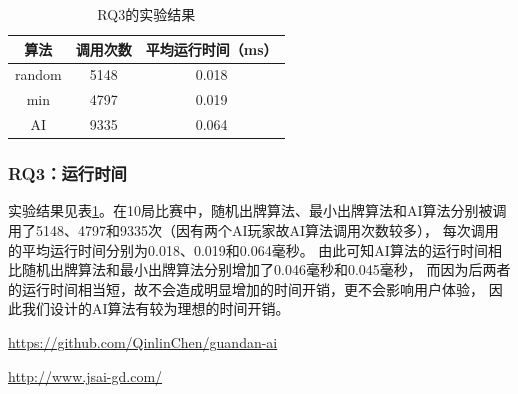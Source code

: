 \documentclass[a4paper]{ctexart}
\begin{document}
\begin{table}
	\centering
	\caption{RQ3的实验结果}
	\label{RQ3_result}
	\begin{tabular}{|c|c|c|}
		\hline
		算法 & 调用次数 & 平均运行时间（ms） \\ \hline
		random & 5148 & 0.018 \\ \hline
		min & 4797 & 0.019 \\ \hline
		AI & 9335 & 0.064 \\ \hline
	\end{tabular}
\end{table}


\subsubsection{RQ3：运行时间}

实验结果见表\ref{RQ3_result}。在10局比赛中，随机出牌算法、最小出牌算法和AI算法分别被调用了5148、4797和9335次（因有两个AI玩家故AI算法调用次数较多），
每次调用的平均运行时间分别为0.018、0.019和0.064毫秒。
由此可知AI算法的运行时间相比随机出牌算法和最小出牌算法分别增加了0.046毫秒和0.045毫秒，
而因为后两者的运行时间相当短，故不会造成明显增加的时间开销，更不会影响用户体验，
因此我们设计的AI算法有较为理想的时间开销。

\begin{thebibliography}{99}
  \url{https://github.com/QinlinChen/guandan-ai}

  \url{http://www.jsai-gd.com/}
\end{thebibliography}
\end{document}
